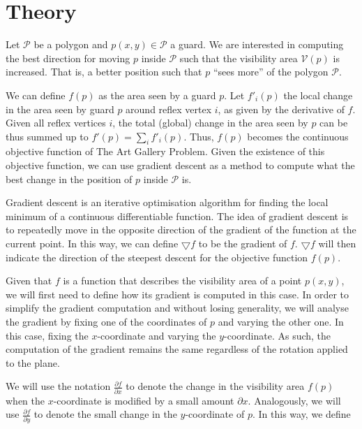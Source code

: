 \section{Theory}


Let $\mathcal P$ be a polygon and $p(x, y) \in \mathcal P$ a guard. We are interested in computing the best direction for moving $p$ inside $\mathcal P$ such that the visibility area $\mathcal V(p)$ is increased. That is, a better position such that $p$ ``sees more'' of the polygon $\mathcal P$. 

We can define $f(p)$ as the area seen by a guard $p$. Let $f'_i(p)$ the local change in the area seen by guard $p$ around reflex vertex $i$, as given by the derivative of $f$. Given all reflex vertices $i$, the total (global) change in the area seen by $p$ can be thus summed up to $f'(p) = \sum_i f'_i(p)$. Thus, $f(p)$ becomes the continuous objective function of The Art Gallery Problem. Given the existence of this objective function, we can use gradient descent as a method to compute what the best change in the position of $p$ inside $\mathcal P$ is.

Gradient descent is an iterative optimisation algorithm for finding the local minimum of a continuous differentiable function. The idea of gradient descent is to repeatedly move in the opposite direction of the gradient of the function at the current point. In this way, we can define $\bigtriangledown f$ to be the gradient of $f$. $\bigtriangledown f$ will then indicate the direction of the steepest descent for the objective function $f(p)$. 



Given that $f$ is a function that describes the visibility area of a point $p(x, y)$, we will first need to define how its gradient is computed in this case. In order to simplify the gradient computation and without losing generality, we will analyse the gradient by fixing one of the coordinates of $p$ and varying the other one. In this case, fixing the $x$-coordinate and varying the $y$-coordinate. As such, the computation of the gradient remains the same regardless of the rotation applied to the plane.


We will use the notation $\frac{\partial f}{\partial x}$ to denote the change in the visibility area $f(p)$ when the $x$-coordinate is modified by a small amount $\partial x$. Analogously, we will use $\frac{\partial f}{\partial y}$ to denote the small change in the $y$-coordinate of $p$. In this way, we define 

